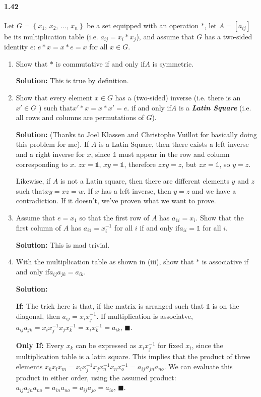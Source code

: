 \documentclass[12pt,a4paper]{article}
\providecommand{\id}{\mathbb{1}}
\providecommand{\bemph}[1]{\emph{\textbf{#1}}}
\providecommand{\soln}{\textbf{Solution: }}
\providecommand{\set}[1]{\left \lbrace #1 \right \rbrace}
\providecommand{\st}{such that\xspace}
\providecommand{\JK}{Joel Klassen\xspace}
\providecommand{\CV}{Christophe Vuillot\xspace}
\renewcommand{\iff}{\textrm{if and only if}\xspace}
\providecommand{\inv}{^{-1}}
\begin{document}
\paragraph*{1.42}
Let $G=\set{x_1,\,x_2,\,\ldots,\,x_n}$ be a set equipped with an operation $\ast$, let $A=\left[ a_{ij} \right]$ be its multiplication table (i.e. $a_{ij} = x_i \ast x_j$), and assume that $G$ has a two-sided identity $e$: $e \ast x = x \ast e = x$ for all $x \in G$.   
\begin{enumerate}[label=(\roman*)]
\item Show that $\ast$ is commutative \iff $A$ is symmetric.

\soln This is true by definition.
\item Show that every element $x \in G$ has a (two-sided) inverse (i.e. there is an $x' \in G$ ) \st $x' \ast x=x \ast x' = e$. \iff $A$ is a \bemph{Latin Square} (i.e. all rows and columns are permutations of $G$). 

\soln (Thanks to \JK and \CV for basically doing this problem for me). If $A$ is a Latin Square, then there exists a left inverse and a right inverse for $x$, since $\id$ must appear in the row and column corresponding to $x$. $zx=\id$, $xy=\id$, therefore $zxy=z$, but $zx=\id$, so $y=z$.

Likewise, if $A$ is not a Latin square, then there are different elements $y$ and $z$ \st $xy=xz=w$. 
If $x$ has a left inverse, then $y=z$ and we have a contradiction. 
If it doesn't, we've proven what we want to prove.

\item Assume that $e=x_1$ so that the first row of $A$ has $a_{1i} = x_i$. 
Show that the first column of $A$ has $a_{i1} = x_i\inv$ for all $i$ \iff $a_{ii}=\id$ for all $i$.

\soln This is mad trivial.
\item With the multiplication table as shown in (iii), show that $\ast$ is associative \iff $a_{ij}a_{jk} = a_{ik}$.

\soln

\textbf{If: } The trick here is that, if the matrix is arranged such that $\id$ is on the diagonal, then $a_{ij} = x_i x_j\inv$. 
If multiplication is associatve, $a_{ij} a_{jk} = x_i x_j\inv x_j x_k\inv = x_i x_k\inv = a_{ik},\, \blacksquare$.

\textbf{Only If: } Every $x_k$ can be expressed as $x_i x_j\inv$ for fixed $x_i$, since the multiplication table is a latin square. 
This implies that the product of three elements $x_k x_l x_m = x_i x_j\inv x_j x_n\inv x_n x_o\inv = a_{ij}a_{jn}a_{no}$. 
We can evaluate this product in either order, using the assumed product: $a_{ij}a_{jn}a_{no} = a_{in}a_{no} = a_{ij}a_{jo} = a_{io},\, \blacksquare$.
\end{enumerate}
\end{document}
